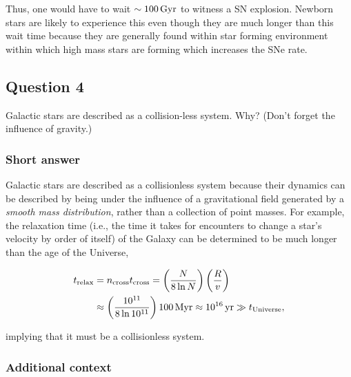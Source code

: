 \documentclass[a4paper,10pt]{article}
\begin{document}
{\noindent}Thus, one would have to wait $\sim100\,{\rm Gyr}$ to witness a SN explosion. Newborn stars are likely to experience this even though they are much longer than this wait time because they are generally found within star forming environment within which high mass stars are forming which increases the SNe rate.



\newpage
\subsection{Question 4}

Galactic stars are described as a collision-less system. Why? (Don’t forget the influence of gravity.)

\subsubsection{Short answer}

Galactic stars are described as a collisionless system because their dynamics can be described by being under the influence of a gravitational field generated by a \textit{smooth mass distribution}, rather than a collection of point masses. For example, the relaxation time (i.e., the time it takes for encounters to change a star's velocity by order of itself) of the Galaxy can be determined to be much longer than the age of the Universe,

\begin{align*}
    t_{\rm relax} &= n_{\rm cross} t_{\rm cross} = \left(\frac{N}{8\ln N}\right) \left(\frac{R}{v}\right) \\
    &\approx \left(\frac{10^{11}}{8\ln10^{11}}\right) 100\,{\rm Myr} \approx 10^{16}\,{\rm yr} \gg t_{\rm Universe},
\end{align*}

{\noindent}implying that it must be a collisionless system.

\subsubsection{Additional context}
\end{document}
